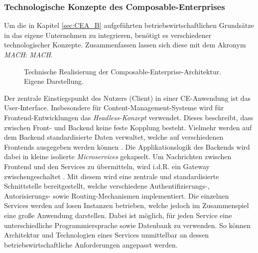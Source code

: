 \subsubsection{Technologische Konzepte des Composable-Enterprises}
Um die in Kapitel \ref{sec:CEA_B} aufgeführten betriebswirtschaftlichen Grundsätze in das eigene Unternehmen zu integrieren, benötigt es verschiedener technologischer Konzepte. Zusammenfassen lassen sich diese mit dem Akronym \textit{MACH}: \textit{\acl{MACH}}.
\begin{center}
	\begin{figure}[H]
		\centering
		\caption[Technische Realisierung der Composable-Enterprise-Architektur]{Technische Realisierung der Composable-Enterprise-Architektur. Eigene Darstellung.}
		\label{fig:CEA_K}
	\end{figure}	
\end{center}
\vspace*{-15mm}
Der zentrale Einstiegspunkt des Nutzers (Client) in einer CE-Anwendung ist das User-Interface. Insbesondere für Content-Management-Systeme wird für Frontend-Entwicklungen das \textit{Headless-Konzept} verwendet. Dieses beschreibt, dass zwischen Front- und Backend keine feste Kopplung besteht. Vielmehr werden auf dem Backend standardisierte Daten verwaltet, welche auf verschiedenen Frontends ausgegeben werden können \cite{.20230313}. Die Applikationslogik des Backends wird dabei in kleine isolierte \textit{Microservices} gekapselt. Um Nachrichten zwischen Frontend und den Services zu übermitteln, wird i.d.R. ein Gateway zwischengeschaltet \cite[41]{.2009}. Mit diesem wird eine zentrale und standardisierte Schnittstelle bereitgestellt, welche verschiedene Authentifizierungs-, Autorisierungs- sowie Routing-Mechanismen implementiert. Die einzelnen Services werden auf losen Instanzen betrieben, welche jedoch im Zusammenspiel eine große Anwendung darstellen. Dabei ist möglich, für jeden Service eine unterschiedliche Programmiersprache sowie Datenbank zu verwenden. So können Architektur und Technologien eines Services unmittelbar an dessen betriebswirtschaftliche Anforderungen angepasst werden.

